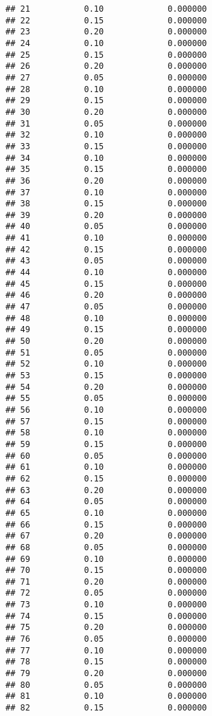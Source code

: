 \documentclass[
]{article}
\begin{document}
\begin{verbatim}
## 21           0.10             0.000000
## 22           0.15             0.000000
## 23           0.20             0.000000
## 24           0.10             0.000000
## 25           0.15             0.000000
## 26           0.20             0.000000
## 27           0.05             0.000000
## 28           0.10             0.000000
## 29           0.15             0.000000
## 30           0.20             0.000000
## 31           0.05             0.000000
## 32           0.10             0.000000
## 33           0.15             0.000000
## 34           0.10             0.000000
## 35           0.15             0.000000
## 36           0.20             0.000000
## 37           0.10             0.000000
## 38           0.15             0.000000
## 39           0.20             0.000000
## 40           0.05             0.000000
## 41           0.10             0.000000
## 42           0.15             0.000000
## 43           0.05             0.000000
## 44           0.10             0.000000
## 45           0.15             0.000000
## 46           0.20             0.000000
## 47           0.05             0.000000
## 48           0.10             0.000000
## 49           0.15             0.000000
## 50           0.20             0.000000
## 51           0.05             0.000000
## 52           0.10             0.000000
## 53           0.15             0.000000
## 54           0.20             0.000000
## 55           0.05             0.000000
## 56           0.10             0.000000
## 57           0.15             0.000000
## 58           0.10             0.000000
## 59           0.15             0.000000
## 60           0.05             0.000000
## 61           0.10             0.000000
## 62           0.15             0.000000
## 63           0.20             0.000000
## 64           0.05             0.000000
## 65           0.10             0.000000
## 66           0.15             0.000000
## 67           0.20             0.000000
## 68           0.05             0.000000
## 69           0.10             0.000000
## 70           0.15             0.000000
## 71           0.20             0.000000
## 72           0.05             0.000000
## 73           0.10             0.000000
## 74           0.15             0.000000
## 75           0.20             0.000000
## 76           0.05             0.000000
## 77           0.10             0.000000
## 78           0.15             0.000000
## 79           0.20             0.000000
## 80           0.05             0.000000
## 81           0.10             0.000000
## 82           0.15             0.000000

\end{verbatim}
\end{document}
